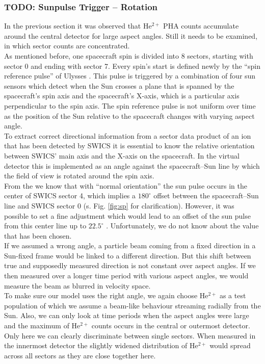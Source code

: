 \subsubsection{TODO: Sunpulse Trigger -- Rotation}
In the previous section it was observed that $\mathrm{He^{2+}}$ PHA counts accumulate around the central detector for large aspect angles. Still it needs to be examined, in which sector counts are concentrated.\\
As mentioned before, one spacecraft spin is divided into 8 sectors, starting with sector 0 and ending with sector 7. Every spin's start is defined newly by the ``spin reference pulse'' of Ulysses \citep{hiscale}. This pulse is triggered by a combination of four sun sensors which detect when the Sun crosses a plane that is spanned by the spacecraft's spin axis and the spacecraft's X-axis, which is a particular axis perpendicular to the spin axis. The spin reference pulse is not uniform over time as the position of the Sun relative to the spacecraft changes with varying aspect angle.\\
To extract correct directional information from a sector data product of an ion that has been detected by SWICS it is essential to know the relative orientation between SWICS' main axis and the X-axis on the spacecraft. In the virtual detector this is implemented as an angle against the spacecraft--Sun line by which the field of view is rotated around the spin axis.\\
From the \citet[][S.20-22]{swics_dpu} we know that with ``normal orientation'' the sun pulse occurs in the center of SWICS sector 4, which implies a $180^\circ$ offset between the spacecraft--Sun line and SWICS sector 0 (s. Fig. \ref{fig:sp} for clarification). However, it was possible to set a fine adjustment which would lead to an offset of the sun pulse from this center line up to $22.5^\circ$ \citet[][S.48]{swics_dpu}. Unfortunately, we do not know about the value that has been chosen.
\\
If we assumed a wrong angle, a particle beam coming from a fixed direction in a Sun-fixed frame would be linked to a different direction. But this shift between true and supposedly measured direction is not constant over aspect angles. If we then measured over a longer time period with various aspect angles, we would measure the beam as blurred in velocity space.
\\
To make sure our model uses the right angle, we again choose $\mathrm{He^{2+}}$ as a test population of which we assume a beam-like behaviour streaming radially from the Sun. Also, we can only look at time periods when the aspect angles were large and the maximum of $\mathrm{He^{2+}}$ counts occurs in the central or outermost detector. Only here we can clearly discriminate between single sectors. When measured in the innermost detector the slightly widened distribution of $\mathrm{He^{2+}}$ would spread across all sectors as they are close together here.
